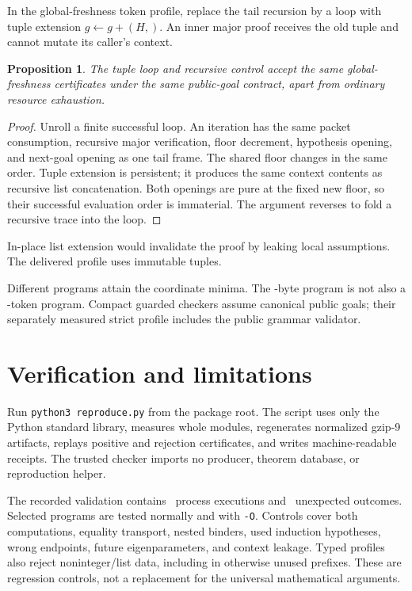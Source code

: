 \documentclass[11pt]{article}
\newtheorem{proposition}[theorem]{Proposition}
\theoremstyle{definition}\newtheorem{definition}[theorem]{Definition}
\theoremstyle{remark}\newtheorem{remark}[theorem]{Remark}
\begin{document}
In the global-freshness token profile, replace the tail recursion
by a loop with tuple extension $g\gets g+(H,)$. An inner major
proof receives the old tuple and cannot mutate its caller's
context.

\begin{proposition}
The tuple loop and recursive control accept the same
global-freshness certificates under the same public-goal contract,
apart from ordinary resource exhaustion.
\end{proposition}
\begin{proof}
Unroll a finite successful loop. An iteration has the same packet
consumption, recursive major verification, floor decrement,
hypothesis opening, and next-goal opening as one tail frame.
The shared floor changes in the same order. Tuple extension is
persistent; it produces the same context contents as recursive
list concatenation. Both openings are pure at the fixed new floor,
so their successful evaluation order is immaterial. The argument
reverses to fold a recursive trace into the loop.
\end{proof}
In-place list extension would invalidate the proof by leaking
local assumptions. The delivered profile uses immutable tuples.

\begin{center}\end{center}
Different programs attain the coordinate minima. The
\CompactNewBytes-byte program is not also a
\CompactNewTokens-token program. Compact guarded checkers assume
canonical public goals; their separately measured strict profile
includes the public grammar validator.

\section{Verification and limitations}

Run \texttt{python3 reproduce.py} from the package root.
The script uses only the Python standard library, measures whole
modules, regenerates normalized gzip-9 artifacts, replays positive
and rejection certificates, and writes machine-readable receipts.
The trusted checker imports no producer, theorem database, or
reproduction helper.

The recorded validation contains \ValidationExecutions\ process
executions and \ValidationFailures\ unexpected outcomes.
Selected programs are tested normally and with \texttt{-O}.
Controls cover both computations, equality transport, nested
binders, used induction hypotheses, wrong endpoints, future
eigenparameters, and context leakage. Typed profiles also reject
noninteger/list data, including in otherwise unused prefixes.
These are regression controls, not a replacement for the universal
mathematical arguments.
\end{document}
